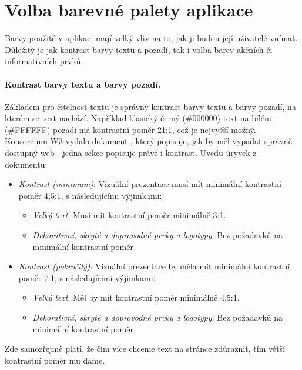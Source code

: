 \section{Volba barevné palety aplikace}\label{draft:colors}

Barvy použité v aplikaci mají velký vliv na to, jak ji budou její uživatelé vnímat. Důležitý je jak kontrast barvy textu a pozadí, tak i volba barev akčních či informativních prvků.

\paragraph{Kontrast barvy textu a barvy pozadí.} Základem pro čitelnost textu je správný kontrast barvy textu a barvy pozadí, na kterém se text nachází. Například klasický černý (\#000000) text na bílém (\#FFFFFF) pozadí má kontrastní poměr 21:1, což je nejvyšší možný. Konsorcium W3 vydalo dokument \cite{w3-access-guide}, který popisuje, jak by měl vypadat správně dostupný web - jedna sekce popisuje právě i kontrast. Uvedu úryvek z dokumentu:
\begin{itemize}
    \item \emph{Kontrast (minimum)}: Vizuální prezentace musí mít minimální kontrastní poměr 4,5:1, s následujícími výjimkami:
    \begin{itemize}
        \item \emph{Velký text}: Musí mít kontrastní poměr minimálně 3:1.
        \item \emph{Dekorativní, skryté a doprovodné prvky a logotypy}: Bez požadavků na minimální kontrastní poměr
    \end{itemize}
    \item \emph{Kontrast (pokročilý)}: Vizuální prezentace by měla mít minimální kontrastní poměr 7:1, s následujícími výjimkami:
    \begin{itemize}
        \item \emph{Velký text}: Měl by mít kontrastní poměr minimálně 4,5:1.
        \item \emph{Dekorativní, skryté a doprovodné prvky a logotypy}: Bez požadavků na minimální kontrastní poměr
    \end{itemize}
\end{itemize}

Zde samozřejmě platí, že čím více chceme text na stránce zdůraznit, tím větší kontrastní poměr mu dáme.

